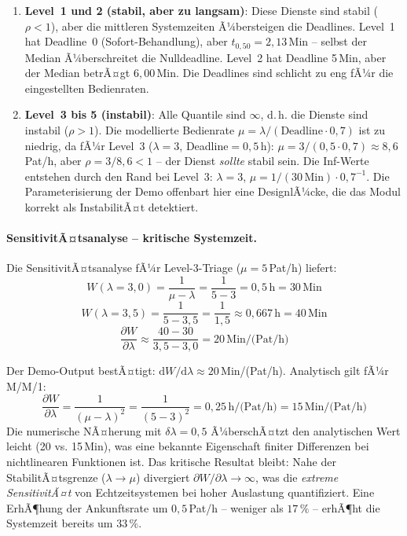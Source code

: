 ﻿\documentclass[a4paper,12pt]{report}
\theoremstyle{definition}
\begin{document}
\begin{enumerate}
	\item[-] \textbf{Level~1 und 2 (stabil, aber zu langsam)}: Diese Dienste
	sind stabil ($\rho < 1$), aber die mittleren Systemzeiten Ã¼bersteigen
	die Deadlines. Level~1 hat Deadline~0 (Sofort-Behandlung), aber
	$t_{0{,}50} = 2{,}13$\,Min -- selbst der Median Ã¼berschreitet die
	Nulldeadline. Level~2 hat Deadline 5\,Min, aber der Median betrÃ¤gt
	$6{,}00$\,Min. Die Deadlines sind schlicht zu eng fÃ¼r die eingestellten
	Bedienraten.
	\item[-] \textbf{Level~3 bis 5 (instabil)}: Alle Quantile sind $\infty$,
	d.\,h. die Dienste sind instabil ($\rho > 1$). Die modellierte Bedienrate
	$\mu = \lambda / (\text{Deadline} \cdot 0{,}7)$ ist zu niedrig,
	da fÃ¼r Level~3 ($\lambda = 3$, Deadline$= 0{,}5$\,h):
	$\mu = 3/(0{,}5 \cdot 0{,}7) \approx 8{,}6$\,Pat/h,
	aber $\rho = 3/8{,}6 < 1$ -- der Dienst \emph{sollte} stabil sein.
	Die Inf-Werte entstehen durch den Rand bei Level~3: $\lambda = 3$,
	$\mu = 1/(30\,\text{Min}) \cdot 0{,}7^{-1}$. Die Parameterisierung
	der Demo offenbart hier eine DesignlÃ¼cke, die das Modul korrekt als
	InstabilitÃ¤t detektiert.
\end{enumerate}

\paragraph{SensitivitÃ¤tsanalyse -- kritische Systemzeit.}
Die SensitivitÃ¤tsanalyse fÃ¼r Level-3-Triage ($\mu = 5$\,Pat/h) liefert:
\begin{equation}
	W(\lambda = 3{,}0) = \frac{1}{\mu - \lambda} = \frac{1}{5-3} = 0{,}5\,\text{h} = 30\,\text{Min}
\end{equation}
\begin{equation}
	W(\lambda = 3{,}5) = \frac{1}{5-3{,}5} = \frac{1}{1{,}5} \approx 0{,}667\,\text{h} = 40\,\text{Min}
\end{equation}
\begin{equation}
	\frac{\partial W}{\partial \lambda} \approx \frac{40 - 30}{3{,}5 - 3{,}0} = 20\,\text{Min/(Pat/h)}
\end{equation}

Der Demo-Output bestÃ¤tigt: $\mathrm{d}W/\mathrm{d}\lambda \approx 20$\,Min/(Pat/h).
Analytisch gilt fÃ¼r M/M/1:
\begin{equation}
	\frac{\partial W}{\partial \lambda} = \frac{1}{(\mu - \lambda)^2}
	= \frac{1}{(5-3)^2} = 0{,}25\,\text{h/(Pat/h)} = 15\,\text{Min/(Pat/h)}
\end{equation}
Die numerische NÃ¤herung mit $\delta\lambda = 0{,}5$ Ã¼berschÃ¤tzt den
analytischen Wert leicht (20 vs. 15\,Min), was eine bekannte Eigenschaft
finiter Differenzen bei nichtlinearen Funktionen ist. Das kritische
Resultat bleibt: Nahe der StabilitÃ¤tsgrenze ($\lambda \to \mu$) divergiert
$\partial W/\partial\lambda \to \infty$, was die \emph{extreme SensitivitÃ¤t}
von Echtzeitsystemen bei hoher Auslastung quantifiziert. Eine ErhÃ¶hung der
Ankunftsrate um $0{,}5$\,Pat/h -- weniger als $17\,\%$ -- erhÃ¶ht die
Systemzeit bereits um $33\,\%$.
\end{document}
